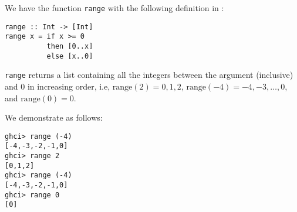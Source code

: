 
We have the function \verb|range| with the following definition in 
:
\scriptsize\begin{verbatim}
range :: Int -> [Int]
range x = if x >= 0
          then [0..x]
          else [x..0]
\end{verbatim}\normalsize
\verb|range| returns a list containing all the integers between the argument 
(inclusive) and 0 in increasing order, i.e, $\text{range}(2) = 0, 1, 2$, 
$\text{range}(-4) = -4, -3, \ldots, 0$, and $\text{range}(0) = 0$.\par
\qquad We demonstrate as follows:
\scriptsize\begin{verbatim}
ghci> range (-4)
[-4,-3,-2,-1,0]
ghci> range 2
[0,1,2]
ghci> range (-4)
[-4,-3,-2,-1,0]
ghci> range 0
[0]
\end{verbatim}\normalsize
